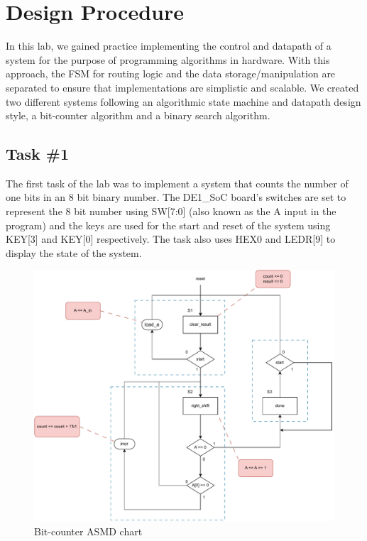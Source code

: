 \documentclass[11pt, titlepage]{article}
\author{Cameron Jennings (ID: 2029631), Donovan Clay (ID: 2276005)}
\title{\assignmentname}
\date{\parbox{\linewidth}{\centering
\experimentDate
  \endgraf\bigskip
  \className\
}}
\begin{document}
	\maketitle
 
    \setcounter{tocdepth}{2}
    \begin{center}
        \tableofcontents\label{beginning}
    \end{center}
    \newpage
    
    \section{Design Procedure}
        In this lab, we gained practice implementing the control and datapath of a system for the purpose of programming algorithms in hardware. With this approach, the FSM for routing logic and the data storage/manipulation are separated to ensure that implementations are simplistic and scalable. We created two different systems following an algorithmic state machine and datapath design style, a bit-counter algorithm and a binary search algorithm.
    
        \subsection{Task \#1}
            The first task of the lab was to implement a system that counts the number of one bits in an 8 bit binary number. The DE1\_SoC board's switches are set to represent the 8 bit number using SW[7:0] (also known as the A input in the program) and the keys are used for the start and reset of the system using KEY[3] and KEY[0] respectively. The task also uses HEX0 and LEDR[9] to display the state of the system.

            \begin{figure}[H]
                \centering
                \includegraphics[scale = 0.7]{Images/task 1 asmd diagram.pdf}
                \caption{Bit-counter ASMD chart}
            \end{figure}
\end{document}
